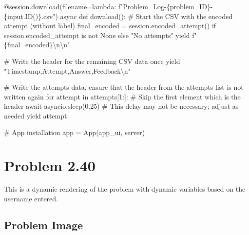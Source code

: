 \documentclass[
  letterpaper,
  DIV=11,
  numbers=noendperiod]{scrreprt}
\newenvironment{Shaded}{\begin{snugshade}}{\end{snugshade}}
\newcommand{\NormalTok}[1]{\textcolor[rgb]{0.00,0.23,0.31}{#1}}
\begin{document}
\begin{Shaded}
\begin{Highlighting}[]
\NormalTok{    @session.download(filename=lambda: f"Problem\_Log{-}\{problem\_ID\}{-}\{input.ID()\}.csv")}
\NormalTok{    async def download():}
\NormalTok{        \# Start the CSV with the encoded attempt (without label)}
\NormalTok{        final\_encoded = session.encoded\_attempt() if session.encoded\_attempt is not None else "No attempts"}
\NormalTok{        yield f"\{final\_encoded\}\textbackslash{}n\textbackslash{}n"}
        
\NormalTok{        \# Write the header for the remaining CSV data once}
\NormalTok{        yield "Timestamp,Attempt,Answer,Feedback\textbackslash{}n"}
        
\NormalTok{        \# Write the attempts data, ensure that the header from the attempts list is not written again}
\NormalTok{        for attempt in attempts[1:]:  \# Skip the first element which is the header}
\NormalTok{            await asyncio.sleep(0.25)  \# This delay may not be necessary; adjust as needed}
\NormalTok{            yield attempt}


\NormalTok{\# App installation}
\NormalTok{app = App(app\_ui, server)}
\end{Highlighting}
\end{Shaded}

\chapter*{Problem 2.40}\label{problem-2.40}


This is a dynamic rendering of the problem with dynamic variables based
on the username entered.

\section*{Problem Image}\label{problem-image-12}

\end{document}

